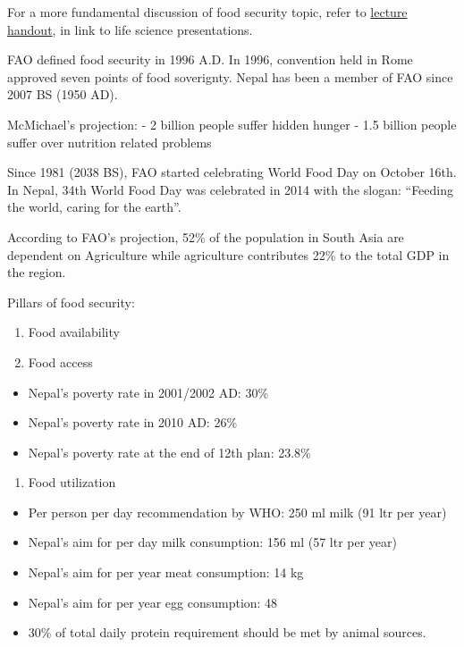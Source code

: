 \documentclass[
  openany]{book}
\providecommand{\tightlist}{%
  \setlength{\itemsep}{0pt}\setlength{\parskip}{0pt}}
\begin{document}
For a more fundamental discussion of food security topic, refer to \href{https://github.com/DeependraD/life_science_presentations/raw/master/food_security.pdf}{lecture handout}, in link to life science presentations.

FAO defined food security in 1996 A.D. In 1996, convention held in Rome approved seven points of food soverignty. Nepal has been a member of FAO since 2007 BS (1950 AD).

McMichael's projection:
- 2 billion people suffer hidden hunger
- 1.5 billion people suffer over nutrition related problems

Since 1981 (2038 BS), FAO started celebrating World Food Day on October 16th. In Nepal, 34th World Food Day was celebrated in 2014 with the slogan: ``Feeding the world, caring for the earth''.

According to FAO's projection, 52\% of the population in South Asia are dependent on Agriculture while agriculture contributes 22\% to the total GDP in the region.

Pillars of food security:

\begin{enumerate}
\def\labelenumi{\arabic{enumi}.}
\tightlist
\item
  Food availability
\item
  Food access
\end{enumerate}

\begin{itemize}
\tightlist
\item
  Nepal's poverty rate in 2001/2002 AD: 30\%
\item
  Nepal's poverty rate in 2010 AD: 26\%
\item
  Nepal's poverty rate at the end of 12th plan: 23.8\%
\end{itemize}

\begin{enumerate}
\def\labelenumi{\arabic{enumi}.}
\setcounter{enumi}{2}
\tightlist
\item
  Food utilization
\end{enumerate}

\begin{itemize}
\tightlist
\item
  Per person per day recommendation by WHO: 250 ml milk (91 ltr per year)
\item
  Nepal's aim for per day milk consumption: 156 ml (57 ltr per year)
\item
  Nepal's aim for per year meat consumption: 14 kg
\item
  Nepal's aim for per year egg consumption: 48
\item
  30\% of total daily protein requirement should be met by animal sources.
\end{itemize}
\end{document}
